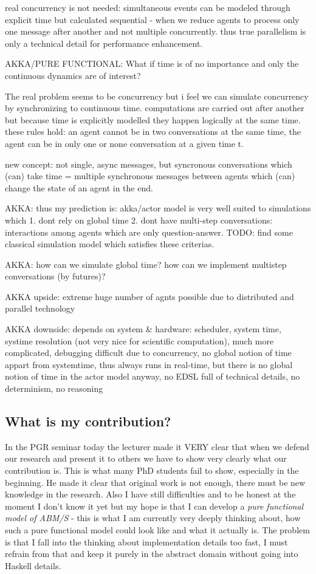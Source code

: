 real concurrency is not needed: simultaneous events can be modeled through explicit time but calculated sequential - when we reduce agents to process only one message after another and not multiple concurrently. thus true parallelism is only a technical detail for performance enhancement.

AKKA/PURE FUNCTIONAL: What if time is of no importance and only the continuous dynamics are of interest?

The real problem seems to be concurrency but i feel we can simulate concurrency by synchronizing to continuous time. computations are carried out after another but because time is explicitly modelled they happen logically at the same time. these rules hold: an agent cannot be in two conversations at the same time, the agent can be in only one or none conversation at a given time t.

new concept: not single, async messages, but syncronous conversations which (can) take time = multiple synchronous messages between agents which (can) change the state of an agent in the end.

AKKA: thus my prediction is: akka/actor model is very well suited to simulations which 1. dont rely on global time 2. dont have multi-step conversations: interactions among agents which are only question-answer. TODO: find some classical simulation model which satisfies these criterias.

AKKA: how can we simulate global time? how can we implement multistep conversations (by futures)?

AKKA upside: extreme huge number of agnts possible due to distributed and parallel technology 

AKKA downside: depends on system \& hardware: scheduler, system time, systime resolution (not very nice for scientific computation), much more complicated, debugging difficult due to concurrency, no global notion of time appart from systemtime, thus always runs in real-time, but there is no global notion of time in the actor model anyway, no EDSL full of technical details, no determinism, no reasoning

\subsection*{What is my contribution?}
In the PGR seminar today the lecturer made it VERY clear that when we defend our research and present it to others we have to show very clearly what our contribution is. This is what many PhD students fail to show, especially in the beginning. He made it clear that original work is not enough, there must be new knowledge in the research. Also I have still difficulties and to be honest at the moment I don't know it yet but my hope is that I can develop a \textit{pure functional model of ABM/S} - this is what I am currently very deeply thinking about, how such a pure functional model could look like and what it actually is. The problem is that I fall into the thinking about implementation details too fast, I must refrain from that and keep it purely in the abstract domain without going into Haskell details.

